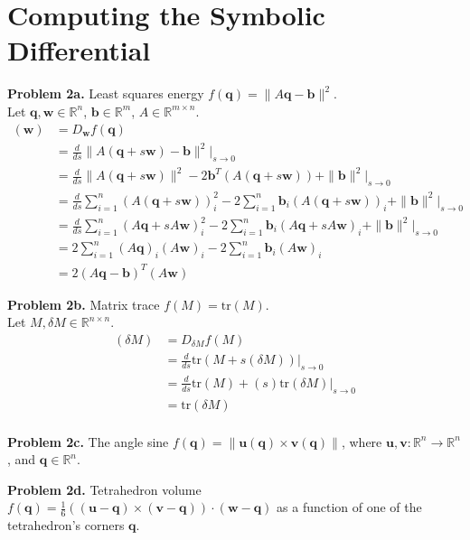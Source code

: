 \documentclass[11pt]{article}
\newcommand{\bq}{\mathbf{q}}
\newcommand{\bb}{\mathbf{b}}
\newcommand{\bu}{\mathbf{u}}
\newcommand{\bv}{\mathbf{v}}
\newcommand{\bw}{\mathbf{w}}
\begin{document}
\pagebreak

\section{Computing the Symbolic Differential}

\noindent \textbf{Problem 2a.}
Least squares energy $f(\bq) = \|A\bq -\bb\|^2$. \\

\noindent Let $\bq, \bw \in \mathbb{R}^n$, $\bb \in \mathbb{R}^m$, $A \in \mathbb{R}^{m \times n}$.
\begin{align*}
[df(\bq)](\bw) 
    &= D_\bw f(\bq) \\
    &= \frac{d}{ds} \|A (\bq + s \bw) - \bb\|^2 \Big|_{s \to 0} \\
    &= \frac{d}{ds} \|A (\bq + s \bw)\|^2 - 2 \bb^T (A (\bq + s \bw)) + \|\bb\|^2 \Big|_{s \to 0} \\
    &= \frac{d}{ds} \sum_{i=1}^n (A (\bq + s \bw))_i^2 - 2 \sum_{i=1}^n \bb_i (A (\bq + s \bw))_i + \|\bb\|^2 \Big|_{s \to 0} \\
    &= \frac{d}{ds} \sum_{i=1}^n (A \bq + s A \bw)_i^2 - 2 \sum_{i=1}^n \bb_i (A \bq + s A \bw)_i + \|\bb\|^2 \Big|_{s \to 0} \\
    &= 2 \sum_{i=1}^n (A \bq)_i (A \bw)_i - 2 \sum_{i=1}^n \bb_i (A \bw)_i \\
    &= 2 (A \bq - \bb)^T (A \bw)
\end{align*}

\noindent \textbf{Problem 2b.}
Matrix trace $f(M) = \mathrm{tr}(M)$. \\

\noindent Let $M, \delta M \in \mathbb{R}^{n \times n}$.
\begin{align*}
[df(M)](\delta M) 
    &= D_{\delta M} f(M) \\
    &= \frac{d}{ds} \mathrm{tr}(M + s(\delta M)) \Big|_{s \to 0} \\
    &= \frac{d}{ds} \mathrm{tr}(M) + (s) \mathrm{tr}(\delta M) \Big|_{s \to 0} \\
    &= \mathrm{tr}(\delta M) \\
\end{align*}

\noindent \textbf{Problem 2c.}
The angle sine $f(\bq) = \|\bu(\bq) \times \bv(\bq)\|$, where $\bu, \bv : \mathbb{R}^n \to \mathbb{R}^n$, and $\bq \in \mathbb{R}^n$. 

\pagebreak

\noindent \textbf{Problem 2d.}
Tetrahedron volume $f(\bq) = \frac{1}{6} ((\bu - \bq) \times (\bv-\bq)) \cdot (\bw -\bq)$ as a function of one of the tetrahedron's corners $\bq$. \\
\end{document}
